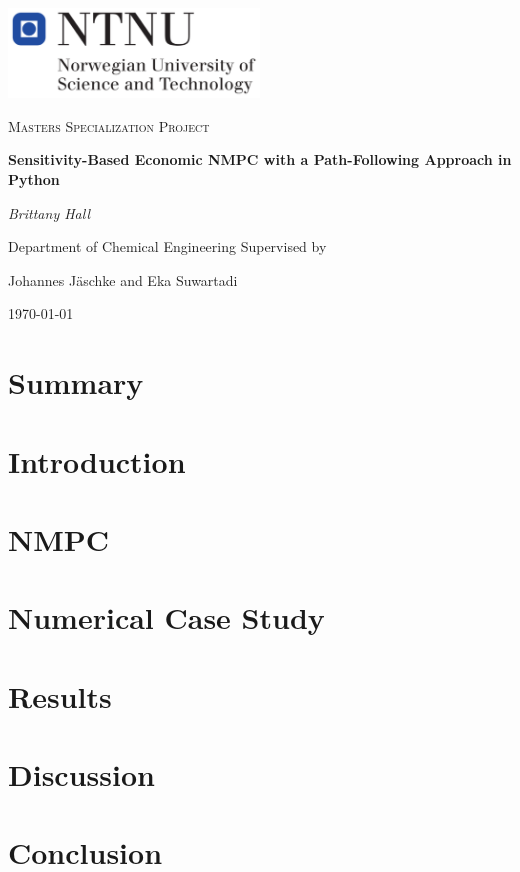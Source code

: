 \documentclass[12pt,a4paper]{report}
\begin{document}
\begin{titlepage}
	\centering
	\includegraphics[width=0.5\textwidth]{NTNU}\par\vspace{1cm}
	\vspace{1cm}
	{\scshape\Large Masters Specialization Project\par}
	\vspace{1.5cm}
	{\huge\bfseries Sensitivity-Based Economic NMPC with a Path-Following Approach in Python\par}
	\vspace{2cm}
	{\Large\itshape Brittany Hall\par}
	\vspace{2cm}
	{\large Department of Chemical Engineering}
	\vfill
	Supervised by\par
	Johannes J{\"a}schke and Eka Suwartadi

	\vfill

	{\large \today\par}
\end{titlepage}
%
\tableofcontents
%
\chapter{Summary}
%
\chapter{Introduction}

\label{ch:intro}
%
\chapter{NMPC}

%
\chapter{Numerical Case Study}

%
\chapter{Results}

%
\chapter{Discussion}
%
\chapter{Conclusion}
%
\printbibliography
\end{document}
